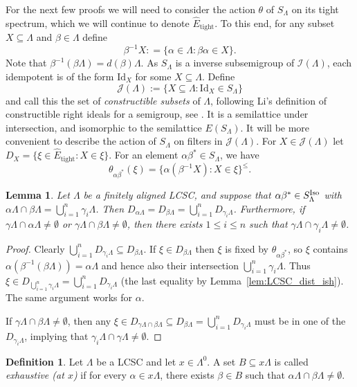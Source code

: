 \documentclass[12pt]{amsart}
\newtheorem{lemma}[thm]{Lemma}
\theoremstyle{definition}
\newtheorem{definition}[thm]{Definition}
\theoremstyle{remark}
\numberwithin{equation}{section}
\newcommand{\Id}{\text{Id}}
\renewcommand{\L}{\Lambda}
\renewcommand{\a}{\alpha}
\renewcommand{\b}{\beta}
\newcommand{\I}{\mathcal{I}}
\newcommand{\J}{\mathcal{J}}
\newcommand{\Et}{\widehat E_{\text{tight}}}
\newcommand{\Iso}{\textup{Iso}}
\begin{document}
	For the next few proofs we will need to consider the action $\theta$ of $S_\L$ on its tight spectrum, which we will continue to denote $\Et$. To this end, for any subset $X\subseteq \L$ and $\b\in \L$ define
	\[
	\b^{-1}X : = \{\alpha\in \L: \b\a\in X\}.
	\]
	Note that $\b^{-1}(\b\L) = d(\b)\L$. As $S_\L$ is a inverse subsemigroup of $\I(\L)$, each idempotent is of the form $\Id_X$ for some $X\subseteq\L$. Define
	\[
	\J(\L) :=\{X\subseteq \L: \Id_X\in S_\L\}
	\]
	and call this the set of {\em constructible subsets} of $\L$, following Li's definition of constructible right ideals for a semigroup, see \cite[Definition~2.1]{Li13}. It is a semilattice under intersection, and isomorphic to the semilattice $E(S_\L)$. It will be more convenient to describe the action of $S_\L$ on filters in $\J(\L)$. For $X\in\J(\L)$ let $D_X = \{\xi \in \Et : X\in \xi\}$. For an element $\a\b^*\in S_\L$, we have
	\[
	\theta_{\a\b^*}(\xi) = \{\a(\b^{-1}X): X\in \xi\}^{\leqslant}.
	\]
	
	\begin{lemma}\label{lem:iso_intersection}
		Let $\L$ be a finitely aligned LCSC, and suppose that $\alpha\beta^*\in S_\L^\Iso$ with $\alpha\L\cap \beta\L = \bigcup_{i=1}^n\gamma_i\L$. Then $D_{\alpha\L} = D_{\beta\L} = \bigcup_{i=1}^nD_{\gamma_i\L}$. Furthermore, if $\gamma\L\cap \alpha\L \neq \emptyset$ or $\gamma\L\cap \beta\L \neq \emptyset$, then there exists $1\leq i\leq n$ such that $\gamma\L\cap\gamma_i\L\neq \emptyset$.
		
	\end{lemma}
	
	\begin{proof}
		Clearly $\bigcup_{i=1}^nD_{\gamma_i\L}\subseteq D_{\beta\L}$. If $\xi\in D_{\beta\L}$ then $\xi$ is fixed by $\theta_{\alpha\beta^*}$, so $\xi$ contains $\alpha(\beta^{-1}(\beta\L)) = \alpha\L$ and hence also their intersection $\bigcup_{i=1}^n\gamma_i\L$. Thus $\xi\in D_{\bigcup_{i=1}^n\gamma_i\L} = \bigcup_{i=1}^nD_{\gamma_i\L}$ (the last equality by Lemma~\ref{lem:LCSC_dist_ish}). The same argument works for $\alpha$.
		
		If $\gamma\L\cap \beta\L\neq \emptyset$, then any $\xi\in D_{\gamma\L\cap\beta\L}\subseteq D_{\beta\L} = \bigcup_{i=1}^nD_{\gamma_i\L}$ must be in one of the $D_{\gamma_i\L}$, implying that $\gamma_i\L\cap \gamma\L\neq\emptyset$.
	\end{proof}
	
	\begin{definition}
		Let $\L$ be a LCSC and let $x\in \L^0$. A set $B\subseteq x\L$ is called {\em exhaustive (at $x$)} if for every $\a\in x\L$, there exists $\b\in B$ such that $\a\L\cap \b\L\neq \emptyset$. 
	\end{definition}
	
\end{document}
